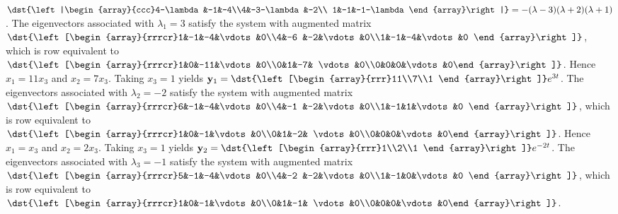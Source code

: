 \documentclass[dvips]{book}
\renewcommand{\exer}[1]{\par\medskip\;\noindent{\color{red}\bf #1.}}
\numberwithin{example}{section}
\numberwithin{equation}{section}
\numberwithin{theorem}{section}
\numberwithin{table}{section}
\numberwithin{figure}{section}
\begin{document}
\exer{10.4.12}
$\dst{\left|\begin{array}{ccc}4-\lambda&-1&-4\\4&-3-\lambda&-2\\
1&-1&-1-\lambda\end{array}\right|}=-(\lambda-3)(\lambda+2)(\lambda+1)$.
The eigenvectors associated
 with $\lambda_1=3$ satisfy the system with  augmented matrix
$\dst{\left[\begin{array}{rrrcr}1&-1&-4&\vdots&0\\4&-6
&-2&\vdots&0\\1&-1&-4&\vdots&0
\end{array}\right]}$,
which is row equivalent to
$\dst{\left[\begin{array}{rrrcr}1&0&-11&\vdots&0\\0&1&-7&
\vdots&0\\0&0&0&\vdots&0\end{array}\right]}$.
Hence  $x_1=11x_3$ and $x_2=7x_3$.  Taking $x_3=1$ yields
${\bf y}_1=\dst{\left[\begin{array}{rrr}11\\7\\1
\end{array}\right]}e^{3t}$.
The eigenvectors associated
 with $\lambda_2=-2$ satisfy the system with  augmented matrix
$\dst{\left[\begin{array}{rrrcr}6&-1&-4&\vdots&0\\4&-1
&-2&\vdots&0\\1&-1&1&\vdots&0
\end{array}\right]}$,
which is row equivalent to
$\dst{\left[\begin{array}{rrrcr}1&0&-1&\vdots&0\\0&1&-2&
\vdots&0\\0&0&0&\vdots&0\end{array}\right]}$.
Hence $x_1=x_3$ and $x_2=2x_3$.  Taking $x_3=1$ yields
${\bf y}_2=\dst{\left[\begin{array}{rrr}1\\2\\1
\end{array}\right]}e^{-2t}$.
The eigenvectors associated
 with $\lambda_3=-1$ satisfy the system with  augmented matrix
$\dst{\left[\begin{array}{rrrcr}5&-1&-4&\vdots&0\\4&-2
&-2&\vdots&0\\1&-1&0&\vdots&0
\end{array}\right]}$,
which is row equivalent to
$\dst{\left[\begin{array}{rrrcr}1&0&-1&\vdots&0\\0&1&-1&
\vdots&0\\0&0&0&\vdots&0\end{array}\right]}$.
\end{document}
